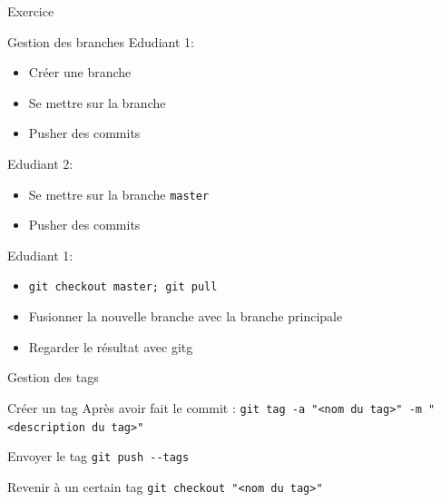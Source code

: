 \documentclass{beamer}
\begin{document}
\begin{frame}[fragile]{Exercice}
  \begin{exampleblock}{Gestion des branches}
  Edudiant 1:
    \begin{itemize}
    \item Créer une branche
    \item Se mettre sur la branche
    \item Pusher des commits
    \end{itemize}
  Edudiant 2:
    \begin{itemize}
    \item Se mettre sur la branche \textcolor{commandcolor}{\verb?master?}
    \item Pusher des commits
    \end{itemize}
  Edudiant 1:
    \begin{itemize}
    \item \textcolor{commandcolor}{\verb?git checkout master; git pull?}
    \item Fusionner la nouvelle branche avec la branche principale
    \item Regarder le résultat avec gitg
    \end{itemize}
  \end{exampleblock}
  
  
  
  
\end{frame}

\begin{frame}[fragile]{Gestion des tags}
  \begin{block}{Créer un tag}
    Après avoir fait le commit :\linebreak
    \textcolor{commandcolor}{\verb?git tag -a "<nom du tag>" -m "<description du tag>"?}
  \end{block}
  \begin{block}{Envoyer le tag}
    \textcolor{commandcolor}{\verb?git push --tags?}
  \end{block}
  \begin{block}{Revenir à un certain tag}
    \textcolor{commandcolor}{\verb?git checkout "<nom du tag>"?}
  \end{block}
\end{frame}
\end{document}
